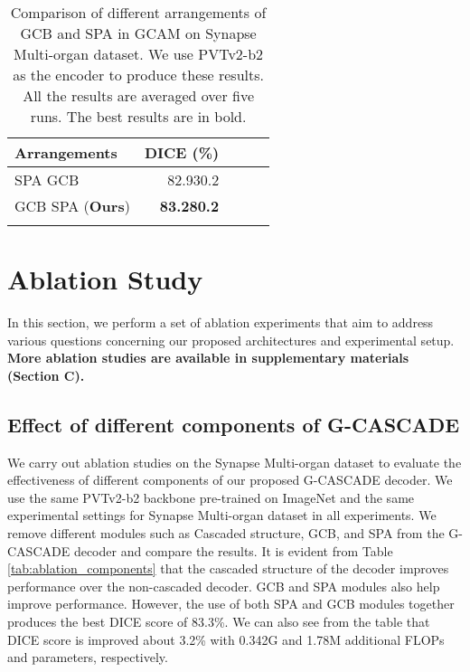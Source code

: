 \documentclass[10pt,twocolumn,letterpaper]{article}
\begin{document}
\begin{table}[t]
\centering 
    {{\begin{tabular}{lrrrr}
\toprule
Arrangements  & \multicolumn{1}{l}{DICE (\%)} \\
\midrule
SPA  GCB & 82.930.2  
\\ GCB  SPA (\textbf{Ours}) & \textbf{83.280.2}  \\
\bottomrule \\
\end{tabular}}


}\caption{Comparison of different arrangements of GCB and SPA in GCAM on Synapse Multi-organ dataset. We use PVTv2-b2 as the encoder to produce these results. All the results are averaged over five runs. The best results are in bold.}
\label{tab:arrangements_sa_gcb}
\end{table}

\section{Ablation Study}
\label{sec:ablation_study}

In this section, we perform a set of ablation experiments that aim to address various questions concerning our proposed architectures and experimental setup. \textbf{More ablation studies are available in supplementary materials (Section C).}





\subsection{Effect of different components of G-CASCADE}
We carry out ablation studies on the Synapse Multi-organ dataset to evaluate the effectiveness of different components of our proposed G-CASCADE decoder. We use the same PVTv2-b2 backbone pre-trained on ImageNet and the same experimental settings for Synapse Multi-organ dataset in all experiments. We remove different modules such as Cascaded structure, GCB, and SPA from the G-CASCADE decoder and compare the results. It is evident from Table \ref{tab:ablation_components} that the cascaded structure of the decoder improves performance over the non-cascaded decoder. GCB and SPA modules also help improve performance. However, the use of both SPA and GCB modules together produces the best DICE score of 83.3\%. We can also see from the table that DICE score is improved about 3.2\% with 0.342G and 1.78M additional FLOPs and parameters, respectively.    
\end{document}
